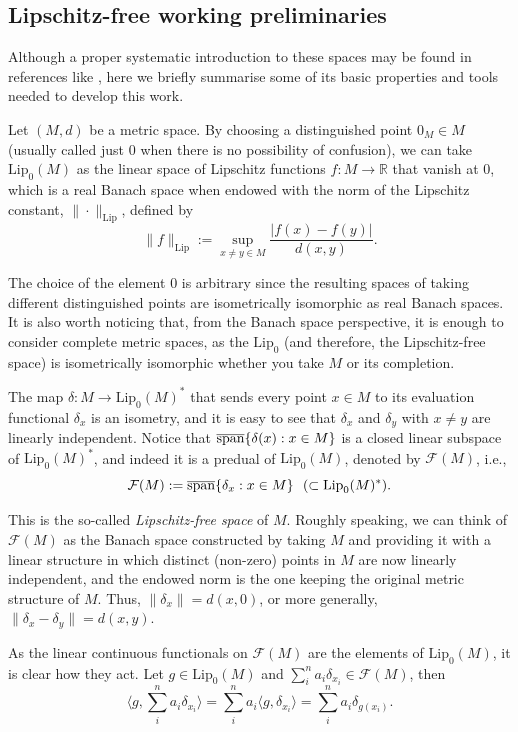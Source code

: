 \documentclass[11pt,reqno]{article}
\newcommand{\free}[1]{\mathcal{F}(#1)} %
\def\lip{ \text{Lip}}
\def\RR{\mathbb{R}}
\def\sp{\hbox{{\rm span}}}
\def\csp{\overline{\sp}}
\def\dd{\delta}
\def\la{\langle}
\def\ra{\rangle}
\begin{document}
\subsection{Lipschitz-free working preliminaries} \label{subsec:free-preliminaries}


Although a proper systematic introduction to these spaces may be found in references like \cite{Weaver2}, here we briefly summarise some of its basic properties and tools needed to develop this work.
  
Let $(M,d)$ be a metric space. By choosing a distinguished point $0_M\in M$ (usually called just $0$ when there is no possibility of confusion), we can take $\lip_0(M)$ as the linear space of Lipschitz functions $f\colon M\to \RR$ that vanish at $0$, which is a real Banach space when endowed with the norm of the Lipschitz constant, $\|\cdot\|_{\text{Lip}}$, defined by
\begin{equation*}
  \|f\|_{\text{Lip}}:= \sup_{x\neq y\in M} \dfrac{|f(x)-f(y)|}{d(x,y)}.
\end{equation*}

The choice of the element $0$ is arbitrary since the resulting spaces of taking different distinguished points are isometrically isomorphic as real Banach spaces. It is also worth noticing that, from the Banach space perspective, it is enough to consider complete metric spaces, as the $\lip_0$ (and therefore, the Lipschitz-free space) is isometrically isomorphic whether you take $M$ or its completion. 

The map $\dd: M \to \lip_0(M)^*$ that sends every point $x\in M$ to its evaluation functional $\dd_x$ is an isometry, and it is easy to see that $\dd_x$ and $\dd_y$ with $x \neq y$ are linearly independent. Notice that $\csp \{ \dd (x) : x\in M \}$ is a closed linear subspace of $\lip_0(M)^*$, and indeed it is a predual of $\lip_0(M)$, denoted by $\free{M}$, i.e.,
\[ \free{M}:= \csp\{\dd_x : x\in M\} \ \ ( \subset \lip_0(M)^* ).\]
  
This is the so-called \textit{Lipschitz-free space} of $M$. Roughly speaking, we can think of $\free{M}$ as the Banach space constructed by taking $M$ and providing it with a linear structure in which distinct (non-zero) points in $M$ are now linearly independent, and the endowed norm is the one keeping the original metric structure of $M$. Thus, $\|\dd_x\|= d(x,0)$, or more generally, $\|\dd_x-\dd_y\|=d(x,y)$.
  
As the linear continuous functionals on $\free{M}$ are the elements of $\lip_0(M)$, it is clear how they act. Let $g\in \lip_0(M)$ and $\sum_i^n a_i \dd_{x_i}\in \free{M}$, then
\[\la g, \sum_i^n a_i \dd_{x_i} \ra= \sum_i^n a_i \la g,   \dd_{x_i} \ra= \sum_i^n a_i \dd_{g(x_i)}.\]
  
\end{document}
